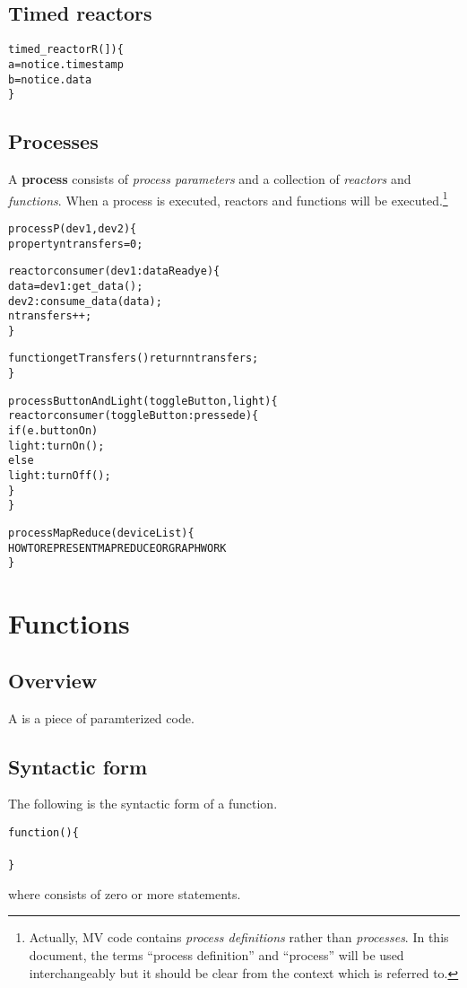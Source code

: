 \documentclass{note}\usepackage{mathptm,mydef}
\begin{document}
\subsection{Timed reactors}
\begin{alltt}
  \textcolor{red2}{timed_reactor R(\textrm{}]) \{
    a = notice.timestamp
    b = notice.data
  \}}
\end{alltt}

\subsection{Processes}
A \textcolor{blue2}{\textbf{process}} consists of 
{\em process parameters\/} and a collection of {\em reactors\/} and {\em
functions\/}. When a process is executed, reactors and functions will be
executed.\footnote{Actually, MV code
contains {\em process definitions} rather than {\em processes}. In this
document, the terms ``process definition'' and ``process'' will be used
interchangeably but it should be clear from the context which is referred
to.} 
\begin{alltt}
  \textcolor{red2}{process P(dev1, dev2) \{
    property ntransfers = 0;

    reactor consumer(dev1:dataReady e) \{
      data = dev1:get_data();
      dev2:consume_data(data);
      ntransfers++;
    \}

    function getTransfers() { return ntransfers; }
  \}}

  \textcolor{red2}{process ButtonAndLight(toggleButton, light) \{
    reactor consumer(toggleButton:pressed e) \{
      if (e.buttonOn)
        light:turnOn();
      else 
        light:turnOff();
    \}
  \}}

  \textcolor{green2}{process MapReduce(deviceList) \{
    HOW TO REPRESENT MAP REDUCE OR GRAPH WORK
  \}}
\end{alltt}

\section{Functions}
\subsection{Overview}
A  is a piece of paramterized code.

\subsection{Syntactic form}
The following is the syntactic form of a function.
\begin{alltt}
  \textcolor{red2}{function \textrm{}(\textrm{}) \{
    \textrm{}
  \}}
\end{alltt}
where  consists of zero or more statements.
\end{document}
